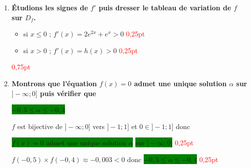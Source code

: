 \documentclass[12pt,a4paper]{article}
\begin{document}
\begin{enumerate}
    si $x \le 0$ ; $f$ est dérivable et on a : 
    
    \colorbox{green}{$f'(x) = 2e^{2x} + e^x$} \hfill \textcolor{red}{0,25pt}
    
    si $x > 0$ ; $f$ est dérivable et on a : 
    
    $
     \begin{aligned}
        f'(x) &= -\ln\left(\dfrac{x}{x+1}\right) - \dfrac{1}{x+1}\\
         &= \ln\left(\dfrac{x+1}{x}\right) - \dfrac{1}{x+1}\\ 
         &= h(x)
      \end{aligned}
     $
    
    D'où \colorbox{green}{$f'(x) = h(x)$} \hfill \textcolor{red}{0,5pt}

    \item \textbf{Étudions les signes de $f'$ puis dresser le tableau de variation de $f$ sur $D_f$.}
    \begin{itemize}
        \item si $x \le 0$ ; $f'(x) = 2e^{2x} + e^x > 0$ \hfill \textcolor{red}{0,25pt}
        \item si $x > 0$ ; $f'(x) = h(x) > 0$ \hfill \textcolor{red}{0,25pt}
    \end{itemize}


    \hfill \textcolor{red}{0,75pt}

    \item \textbf{Montrons que l'équation $f(x) = 0$ admet une unique solution $\alpha$ sur $]-\infty ; 0]$ puis vérifier que }
    
    \colorbox{green}{$-0,5 \le \alpha \le -0,4$}
    
    $f$ est bijective de $]-\infty ; 0]$ vers $]-1 ; 1]$ et $0 \in ]-1 ; 1]$ donc 
    
    \colorbox{green}{$f(x) = 0$ admet une unique solution $\alpha$} \colorbox{green}{sur $]-\infty ; 0]$} \hfill \textcolor{red}{0,25pt}
    
    $f(-0,5) \times f(-0,4) \approx -0,003 < 0$ donc \colorbox{green}{$-0,5 \le \alpha \le -0,4$} \hfill \textcolor{red}{0,25pt}


\end{enumerate}
\end{document}
